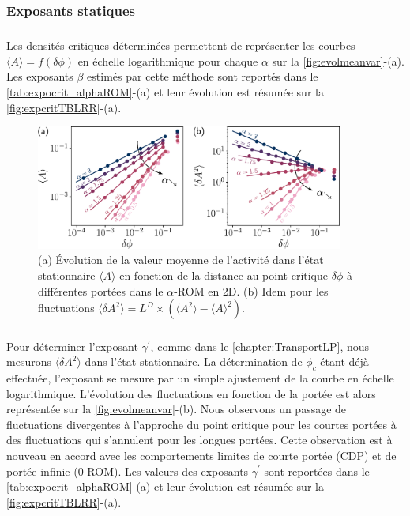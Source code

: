 \subsubsection{Exposants statiques}

\label{sec:TBLRRStat}

\subparagraph{}Les densités critiques déterminées permettent de représenter les courbes $\langle A \rangle = f(\delta\phi)$ en échelle logarithmique pour chaque $\alpha$ sur la \autoref{fig:evolmeanvar}-(a). Les exposants $\beta$ estimés par cette méthode sont reportés dans le \autoref{tab:expocrit_alphaROM}-(a) et leur évolution est résumée sur la \autoref{fig:expcritTBLRR}-(a).

\begin{figure}[h]
	\centering
	\includegraphics[width=0.9\textwidth]{Chapitre3/Figures/BetaGamma/EvolMeanVar_edited.pdf}
	\caption{(a) Évolution de la valeur moyenne de l'activité dans l'état stationnaire $\langle A \rangle$ en fonction de la distance au point critique $\delta\phi$ à différentes portées dans le $\alpha$-ROM en 2D. (b) Idem pour les fluctuations $\langle \delta A^2\rangle = L^D\times(\langle A ^2 \rangle - \langle A \rangle^2)$.}
	\label{fig:evolmeanvar}
\end{figure}

\subparagraph{}Pour déterminer l'exposant $\gamma^\prime$, comme dans le \autoref{chapter:TransportLP}, nous mesurons $\langle \delta A^2\rangle$ dans l'état stationnaire. La détermination de $\phi_c$ étant déjà effectuée, l'exposant se mesure par un simple ajustement de la courbe en échelle logarithmique. L'évolution des fluctuations en fonction de la portée est alors représentée sur la \autoref{fig:evolmeanvar}-(b). Nous observons un passage de fluctuations divergentes à l'approche du point critique pour les courtes portées à des fluctuations qui s'annulent pour les longues portées. Cette observation est à nouveau en accord avec les comportements limites de courte portée (CDP) et de portée infinie ($0$-ROM). Les valeurs des exposants $\gamma^\prime$ sont reportées dans le \autoref{tab:expocrit_alphaROM}-(a) et leur évolution est résumée sur la \autoref{fig:expcritTBLRR}-(a).

